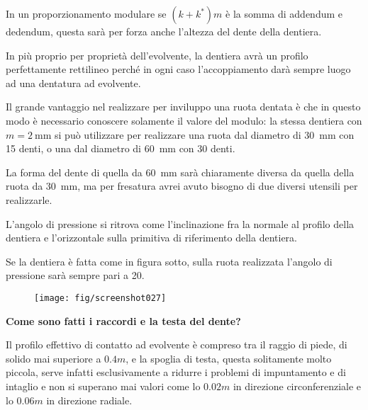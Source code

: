 \documentclass[a4paper, 15pt]{article}
\begin{document}
\begin{adjustwidth}{2in}{}
		In un proporzionamento modulare se $(k+k^*)m$ è la somma di addendum e dedendum, questa sarà per forza anche l'altezza del dente della dentiera. 
		
		In più proprio per proprietà dell'evolvente, la dentiera avrà un profilo perfettamente rettilineo perché in ogni caso l'accoppiamento darà sempre luogo ad una dentatura ad evolvente. \newline
		
		Il grande vantaggio nel realizzare per inviluppo una ruota dentata è che in questo modo è necessario conoscere solamente il valore del modulo: la stessa dentiera con $m=\SI{2}{\milli\meter}$ si può utilizzare per realizzare una ruota dal diametro di \SI{30}{\milli\meter} con 15 denti, o una dal diametro di \SI{60}{\milli\meter} con 30 denti. 
		
		La forma del dente di quella da \SI{60}{\milli\meter} sarà chiaramente diversa da quella della ruota da \SI{30}{\milli\meter}, ma per fresatura avrei avuto bisogno di due diversi utensili per realizzarle.\newline
		
		L'angolo di pressione si ritrova come l'inclinazione fra la normale al profilo della dentiera e l'orizzontale sulla primitiva di riferimento della dentiera. 
		
		Se la dentiera è fatta come in figura sotto, sulla ruota realizzata l'angolo di pressione sarà sempre pari a 20\degree. 
		\begin{figure}[H]
			\centering
			\texttt{[image: fig/screenshot027]}
			\label{fig:screenshot027}
		\end{figure}		
		\textbf{Come sono fatti i raccordi e la testa del dente?} 
		
		Il profilo effettivo di contatto ad evolvente è compreso tra il raggio di piede, di solido mai superiore a $0.4m$, e la spoglia di testa, questa solitamente molto piccola, serve infatti esclusivamente a ridurre i problemi di impuntamento e di intaglio e non si superano mai valori come lo $0.02m$ in direzione circonferenziale e lo $0.06m$ in direzione radiale.
\end{adjustwidth}
\newpage
\end{document}
